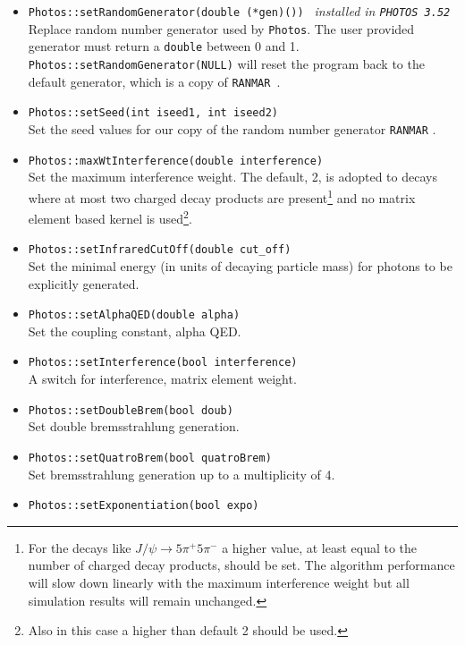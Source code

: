 \documentclass[]{Photos_interface_design}
\begin{document}
\begin{itemize}
  \item {\tt Photos::setRandomGenerator(double (*gen)()) } {\it  installed in {\tt PHOTOS 3.52}}\\
        Replace random number generator used by {\tt Photos}.
        The user provided generator   must return a {\tt double} between 0 and 1. 
        {\tt Photos::setRandomGenerator(NULL)} will reset the program back to  
        the default generator, which is a copy of {\tt RANMAR}~\cite{James:1988vf,marsaglia:1987}.
  \item {\tt Photos::setSeed(int iseed1, int iseed2)} \\
        Set the  seed values for our copy of the random number generator {\tt RANMAR} \cite{James:1988vf,marsaglia:1987}.
  \item {\tt Photos::maxWtInterference(double interference)} \\
        Set the maximum interference weight. The default, 2, is adopted to decays where at most two charged decay products
        are present\footnote{For 
        the decays like $J/\psi \to 5\pi^+ 5\pi^-$ a higher value, at least equal to the number of charged decay 
        products, should be set. The algorithm performance will slow down linearly with the  maximum interference weight but all 
        simulation results will remain unchanged.   
        } and no matrix element based kernel is used\footnote{Also in this case a higher  than default 2 should be used.}.
  \item {\tt Photos::setInfraredCutOff(double cut\_off)} \\
        Set the minimal energy (in units of decaying particle mass)
        for photons to be explicitly generated.
  \item {\tt Photos::setAlphaQED(double alpha)} \\
        Set the coupling constant, alpha QED.
  \item {\tt Photos::setInterference(bool interference)} \\
        A switch for interference, matrix element weight.
  \item {\tt Photos::setDoubleBrem(bool doub)} \\
        Set double bremsstrahlung generation.
  \item {\tt Photos::setQuatroBrem(bool quatroBrem)} \\
        Set bremsstrahlung generation up to a multiplicity of 4.
  \item {\tt Photos::setExponentiation(bool expo)} \\

\end{itemize}
\end{document}
